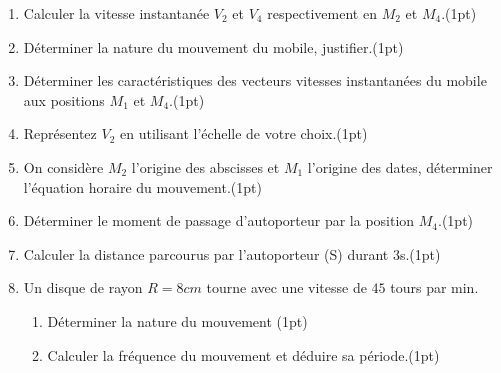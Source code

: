 \documentclass[12pt]{article}
\begin{document}
\begin{enumerate}

	\item Calculer la vitesse instantanée $V_2$ et $V_4$ respectivement en $M_2$ et $M_4$.\dotfill(1pt)
	\item Déterminer la nature du mouvement du mobile, justifier.\dotfill(1pt)
	\item Déterminer les caractéristiques des vecteurs vitesses instantanées du mobile aux positions $M_1$ et $M_4$.\dotfill(1pt)


	\item Représentez $V_2$ en utilisant l'échelle de votre choix.\dotfill(1pt)
	\item On considère $M_2$ l’origine des abscisses et $M_1$ l’origine des dates, déterminer l’équation horaire du mouvement.\dotfill(1pt)
	\item Déterminer le moment de passage d'autoporteur par la position $M_4$.\dotfill(1pt)

	\item Calculer la distance parcourus par l’autoporteur (S) durant 3s.\dotfill(1pt)
	\item Un disque de rayon $R = 8cm$ tourne avec une vitesse de $45$ tours par min.
	      \begin{enumerate}
		      \item  Déterminer la nature du mouvement  \dotfill(1pt)

		      \item Calculer la fréquence du mouvement et déduire sa période.\dotfill(1pt)

	      \end{enumerate}
\end{enumerate}
\end{document}
